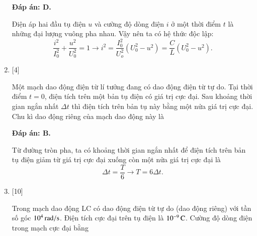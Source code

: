 \begin{enumerate}[label=\bfseries Câu \arabic*:]
	\hideall
	{		\textbf{Đáp án: D.}
		
		Điện áp hai đầu tụ điện $u$ và cường độ dòng điện $i$ ở một thời điểm $t$ là những đại lượng vuông pha nhau. Vậy nên ta có hệ thức độc lập:
		$$
		\dfrac{i^{2}}{I_{0}^{2}}+\dfrac{u^{2}}{U_{0}^{2}}=1 \rightarrow i^{2}=\dfrac{I_{0}^{2}}{U_{o}^{2}}\left(U_{0}^{2}-u^{2}\right)=\dfrac{C}{L}\left(U_{0}^{2}-u^{2}\right).
		$$
	}
	
	\item {} [4]
	
	{Một mạch dao động điện từ lí tưởng đang có dao động điện từ tự do. Tại thời điểm $t = 0$, điện tích trên một bản tụ điện có giá trị cực đại. Sau khoảng thời gian ngắn nhất $\Delta t$ thì điện tích trên bản tụ này bằng một nửa giá trị cực đại. Chu kì dao động riêng của mạch dao động này là
	}
	
	\hideall
	{		\textbf{Đáp án: B.}
		
		Từ đường tròn pha, ta có khoảng thời gian ngắn nhất để điện tích trên bản tụ điện giảm từ giá trị cực đại xuống còn một nửa giá trị cực đại là
		$$
		\Delta t=\dfrac{T}{6} \rightarrow T=6 \Delta t.
		$$
		
	}
	
	\item {} [10]
	
	{Trong mạch dao động LC có dao động điện từ tự do (dao động riêng) với tần số góc $\xsi{10^{4}}{rad/s}$. Điện tích cực đại trên tụ điện là $\xsi{10^{-9}}{C}$. Cường độ dòng điện trong mạch cực đại bằng
	}
	

\end{enumerate}
